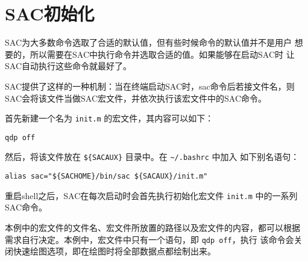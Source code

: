 \section{SAC初始化}
\label{sec:init-macro}
SAC为大多数命令选取了合适的默认值，但有些时候命令的默认值并不是用户
想要的，所以需要在SAC中执行命令并选取合适的值。如果能够在启动SAC时
让SAC自动执行这些命令就最好了。

SAC提供了这样的一种机制：当在终端启动SAC时，sac命令后若接文件名，则
SAC会将该文件当做SAC宏文件，并依次执行该宏文件中的SAC命令。

首先新建一个名为 \texttt{init.m} 的宏文件，其内容可以如下：
\begin{verbatim}
qdp off
\end{verbatim}

然后，将该文件放在 \verb|${SACAUX}| 目录中。在 \verb|~/.bashrc| 中加入
如下别名语句：
\begin{verbatim}
alias sac="${SACHOME}/bin/sac ${SACAUX}/init.m"
\end{verbatim}

重启shell之后，SAC在每次启动时会首先执行初始化宏文件 \texttt{init.m}
中的一系列SAC命令。

本例中的宏文件的文件名、宏文件所放置的路径以及宏文件的内容，都可以根据
需求自行决定。本例中，宏文件中只有一个语句，即 \texttt{qdp off}，执行
该命令会关闭快速绘图选项，即在绘图时将全部数据点都绘制出来。
